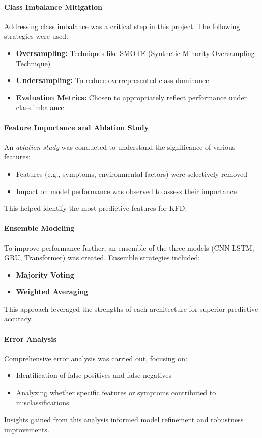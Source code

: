 \documentclass[conference]{IEEEtran}
\begin{document}
\paragraph{Class Imbalance Mitigation}
Addressing class imbalance was a critical step in this project. The following strategies were used:
\begin{itemize}
    \item \textbf{Oversampling:} Techniques like SMOTE (Synthetic Minority Oversampling Technique)
    \item \textbf{Undersampling:} To reduce overrepresented class dominance
    \item \textbf{Evaluation Metrics:} Chosen to appropriately reflect performance under class imbalance
\end{itemize}

\paragraph{Feature Importance and Ablation Study}
An \textit{ablation study} was conducted to understand the significance of various features:
\begin{itemize}
    \item Features (e.g., symptoms, environmental factors) were selectively removed
    \item Impact on model performance was observed to assess their importance
\end{itemize}
This helped identify the most predictive features for KFD.

\paragraph{Ensemble Modeling}
To improve performance further, an ensemble of the three models (CNN-LSTM, GRU, Transformer) was created. Ensemble strategies included:
\begin{itemize}
    \item \textbf{Majority Voting}
    \item \textbf{Weighted Averaging}
\end{itemize}
This approach leveraged the strengths of each architecture for superior predictive accuracy.

\paragraph{Error Analysis}
Comprehensive error analysis was carried out, focusing on:
\begin{itemize}
    \item Identification of false positives and false negatives
    \item Analyzing whether specific features or symptoms contributed to misclassifications
\end{itemize}
Insights gained from this analysis informed model refinement and robustness improvements.
\end{document}
